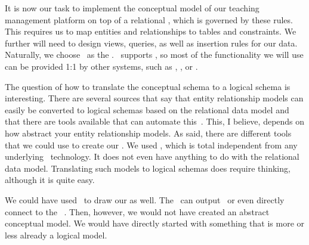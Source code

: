 %
%
It is now our task to implement the conceptual model of our teaching management platform on top of a relational , which is governed by these rules.
This requires us to map entities and relationships to tables and constraints.
We further will need to design views, queries, as well as insertion rules for our data.
Naturally, we choose \postgresql\ as the .
\postgresql\ supports \sql, so most of the functionality we will use can be provided 1:1 by other systems, such as \mysql, \mariadb, or \sqlite.

The question of how to translate the conceptual schema to a logical schema is interesting.
There are several sources that say that entity relationship models can easily be converted to logical schemas based on the relational data model and that there are tools available that can automate this~\cite{SS2005EIDDDFDB:SDLDUTRDM}.
This, I believe, depends on how abstract your entity relationship models.
As said, there are different tools that we could use to create our .
We used \yEd, which is total independent from any underlying \db\ technology.
It does not even have anything to do with the relational data model.
Translating such models to logical schemas does require thinking, although it is quite easy.

We could have used \pgmodeler\ to draw our  as well.
The \pgmodeler\ can output \sql\ or even directly connect to the \postgresql\ \dbms.
Then, however, we would not have created an abstract conceptual model.
We would have directly started with something that is more or less already a logical model.%
%
%
\endhsection%
%

